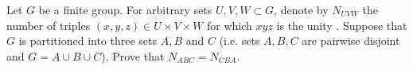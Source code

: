 Let $ G$ be a finite group. For arbitrary sets $ U, V, W \subset G$, denote by $ N_{UVW}$ the number of triples $ (x, y, z) \in U \times V \times W$ for which $ xyz$ is the unity .
Suppose that $ G$ is partitioned into three sets $ A, B$ and $ C$ (i.e. sets $ A, B, C$ are pairwise disjoint and $ G = A \cup B \cup C$). Prove that $ N_{ABC}= N_{CBA}.$